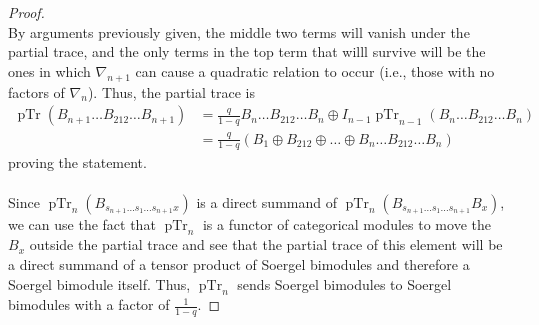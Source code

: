 \documentclass[11pt]{article}
\DeclareMathOperator{\pTr}{pTr}
\theoremstyle{definition}
\theoremstyle{remark}
\numberwithin{equation}{section}
\begin{document}
\begin{proof}
\[\]
By arguments previously given, the middle two terms will vanish under the partial
trace, and the only terms in the top term that willl survive will be the ones
in which $\nabla_{n+1}$ can cause a quadratic relation to occur (i.e., those
with no factors of $\nabla_n$). Thus, the partial trace is
\begin{align*}\pTr(B_{n+1}\dots B_{212}\dots B_{n+1})&=
	\frac{q}{1-q}B_{n}\dots B_{212}\dots B_{n} \oplus I_{n-1}
\pTr_{n-1}(B_{n}\dots B_{212}\dots B_n)\\
	&= \frac{q}{1-q}(B_1\oplus B_{212}\oplus \dots
\oplus B_{n}\dots B_{212}\dots B_n)\end{align*}
proving the statement.
\\ \\
Since $\pTr_n(B_{s_{n+1}\dots s_1\dots s_{n+1}x})$ is a direct summand
of $\pTr_{n}(B_{s_{n+1}\dots s_1\dots s_{n+1}}B_x)$, we can use the fact that
$\pTr_n$ is a functor of categorical modules to move the $B_x$ outside the
partial trace and see that the partial trace of this element will be a direct
summand of a tensor product of Soergel bimodules and therefore a Soergel
bimodule itself. Thus, $\pTr_n$ sends Soergel bimodules to Soergel bimodules with
a factor of $\frac{1}{1-q}$.
\end{proof}


\end{document}
